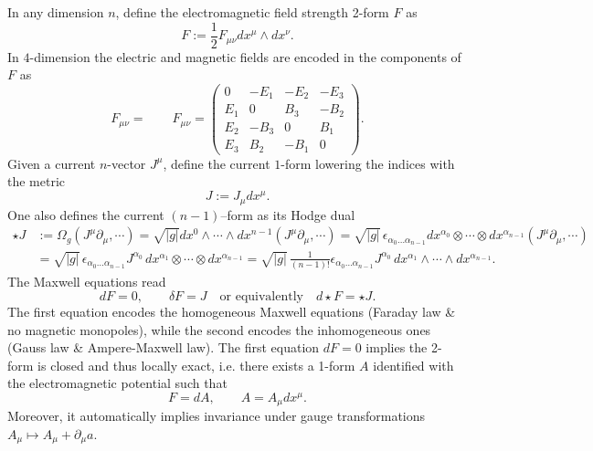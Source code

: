 \documentclass[../geometry_main.tex]{subfiles}
\begin{document}
\begin{mytheorem}
In any dimension $n$, define the electromagnetic field strength 2-form \(F\) as
\begin{equation}
    F := \frac{1}{2} F_{\mu \nu} dx^{\mu} \wedge dx^{\nu}.
\end{equation}
In $4$-dimension the electric and magnetic fields are encoded in the components of $F$ as
\begin{equation}
    F_{\mu \nu} = \qquad F_{\mu\nu} = \begin{pmatrix}
    0 & -E_1 & -E_2 & -E_3 \\
    E_1 & 0 & B_3 & -B_2 \\
    E_2 & -B_3 & 0 & B_1 \\
    E_3 & B_2 & -B_1 & 0
    \end{pmatrix}.
\end{equation}
%
Given a current $n$-vector $J^\mu$, define the current $1$-form lowering the indices with the metric
\begin{equation}
    J := J_{\mu} dx^{\mu}.
\end{equation}
One also defines the current $(n-1)$--form as its Hodge dual
{\small
\begin{align}
    \star J &:= \Omega_g(J^\mu \partial_\mu,\cdots)= \sqrt{|g|}dx^0\wedge \cdots \wedge dx^{n-1} (J^\mu \partial_\mu,\cdots) 
    = \sqrt{|g|}\,\epsilon_{\alpha_0\dots \alpha_{n-1}} dx^{\alpha_0} \otimes \cdots \otimes dx^{\alpha_{n-1}} (J^\mu \partial_\mu,\cdots)
    \\
    &=  \sqrt{|g|}\,\epsilon_{\alpha_0\dots \alpha_{n-1}} J^{\alpha_0}\, dx^{\alpha_1} \otimes \cdots \otimes dx^{\alpha_{n-1}} 
    = \sqrt{|g|}\,\frac{1}{(n-1)!}\epsilon_{\alpha_0\dots \alpha_{n-1}} J^{\alpha_0}\, dx^{\alpha_1} \wedge \cdots \wedge dx^{\alpha_{n-1}}.
\end{align}
}
%
The Maxwell equations read
\begin{equation}
    dF = 0, \qquad \delta F = J \quad \text{or equivalently} \quad d \star F = \star J.
\end{equation}
The first equation encodes the homogeneous Maxwell equations (Faraday law \& no magnetic monopoles), while the second encodes the inhomogeneous ones (Gauss law \& Ampere-Maxwell law).
The first equation \(dF=0\) implies the 2-form is closed and thus locally exact, i.e. there exists a 1-form $A$ identified with the electromagnetic potential such that
\begin{equation}
    F = dA,\qquad A = A_{\mu} dx^{\mu}.
\end{equation}
Moreover, it automatically implies invariance under gauge transformations $A_\mu\mapsto A_\mu + \partial_\mu a$.
\end{mytheorem}
\end{document}
